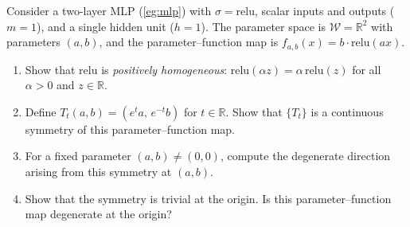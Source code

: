 \documentclass[11pt]{article}
\newcommand{\R}{\mathbb{R}}
\newcommand{\relu}{\mathrm{relu}}
\newcommand{\W}{\mathcal{W}}
\begin{document}
\begin{exercise}
\label{ex:relu-scaling}
Consider a two-layer MLP (\cref{eg:mlp}) with $\sigma = \relu$, scalar inputs and outputs ($m = 1$), and a single hidden unit ($h = 1$). The parameter space is $\W = \R^2$ with parameters $(a, b)$, and the parameter--function map is $f_{a,b}(x) = b \cdot \relu(ax)$.
\begin{enumerate}
    \item
        Show that $\relu$ is \emph{positively homogeneous}: $\relu(\alpha z) =
        \alpha \, \relu(z)$ for all $\alpha > 0$ and $z \in \R$.
    \item
        Define $T_t(a, b) = (e^t a, \, e^{-t} b)$ for $t \in \R$. Show that
        $\{T_t\}$ is a continuous symmetry of this parameter--function map.
    \item
        For a fixed parameter $(a, b) \neq (0, 0)$, compute the degenerate
        direction arising from this symmetry at $(a, b)$.
    \item
        Show that the symmetry is trivial at the origin. Is this
        parameter--function map degenerate at the origin?
\end{enumerate}
\end{exercise}
\end{document}
